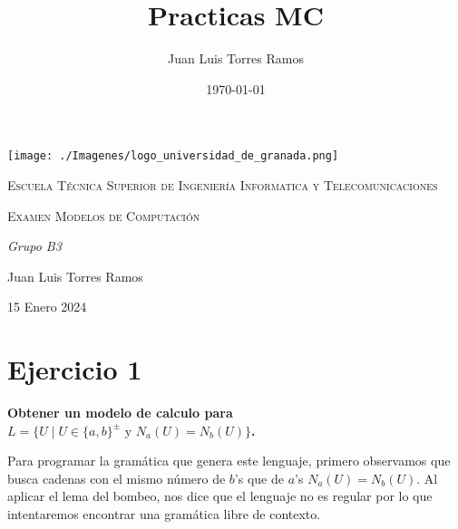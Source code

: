 \documentclass{article}
\title{Practicas MC}
\date{\today}
\author{Juan Luis Torres Ramos}
\begin{document}
        

        \begin{titlepage}
            \centering
            {\texttt{[image: ./Imagenes/logo\_universidad\_de\_granada.png]}\par}
            \vspace{1cm}
            {\scshape\Large Escuela Técnica Superior de Ingeniería Informatica y Telecomunicaciones \par}
            \vspace{2.5cm}
            {\scshape\Huge Examen Modelos de Computación \par}
            \vspace{1cm}
            {\itshape\Large  Grupo B3 \par} 
            \vfill
            {\Large Juan Luis Torres Ramos \par}
            \vspace{0.5cm}
            {\large 15 Enero 2024 \par}
        \end{titlepage}

        \newpage  
        \tableofcontents
        \newpage 


        \section{Ejercicio 1}
            \textbf{Obtener un modelo de calculo para $L = \{ U \mid U \in \{a, b\}^{\pm} \text{ y } N_a(U) = N_b(U) \}$.}
            
            
            \vspace{\baselineskip} %

            Para programar la gramática que genera este lenguaje, primero observamos que busca cadenas con el mismo número de $b$'s que de $a$'s $N_a(U) = N_b(U)$. 
            Al aplicar el lema del bombeo, nos dice que el lenguaje no es regular por lo que intentaremos encontrar una gramática libre de contexto. 
            \vspace{\baselineskip} %
\end{document}
